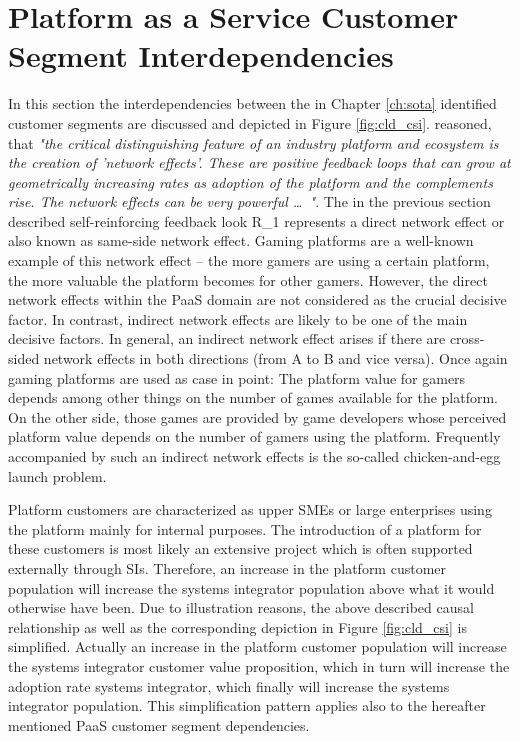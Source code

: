 \section{Platform as a Service Customer Segment Interdependencies}\label{ch:cld:csi}

In this section the interdependencies between the in Chapter \ref{ch:sota} identified customer segments are discussed and depicted in Figure \ref{fig:cld_csi}. \citet[p. 33]{Cusumano2010} reasoned, that \textit{"the critical distinguishing feature of an industry platform and ecosystem is the creation of 'network effects'. These are positive feedback loops that can grow at geometrically increasing rates as adoption of the platform and the complements rise. The network effects can be very powerful \ldots~"}. The in the previous section described self-reinforcing feedback look R\_1 represents a direct network effect or also known as same-side network effect. Gaming platforms are a well-known example of this network effect -- the more gamers are using a certain platform, the more valuable the platform becomes for other gamers. However, the direct network effects within the \ac{PaaS} domain are not considered as the crucial decisive factor. In contrast, indirect network effects are likely to be one of the main decisive factors. In general, an indirect network effect arises if there are cross-sided network effects in both directions (from A to B and vice versa). Once again gaming platforms are used as case in point: The platform value for gamers depends among other things on the number of games available for the platform. On the other side, those games are provided by game developers whose perceived platform value depends on the number of gamers using the platform. Frequently accompanied by such an indirect network effects is the so-called chicken-and-egg launch problem. 

Platform customers are characterized as upper \acp{SME} or large enterprises using the platform mainly for internal purposes. The introduction of a platform for these customers is most likely an extensive project which is often supported externally through \acp{SI}. Therefore, an increase in the platform customer population will increase the systems integrator population above what it would otherwise have been. Due to illustration reasons, the above described causal relationship as well as the corresponding depiction in Figure \ref{fig:cld_csi} is simplified. Actually an increase in the platform customer population will increase the systems integrator customer value proposition, which in turn will increase the adoption rate systems integrator, which finally will increase the systems integrator population. This simplification pattern applies also to the hereafter mentioned \ac{PaaS} customer segment dependencies.

